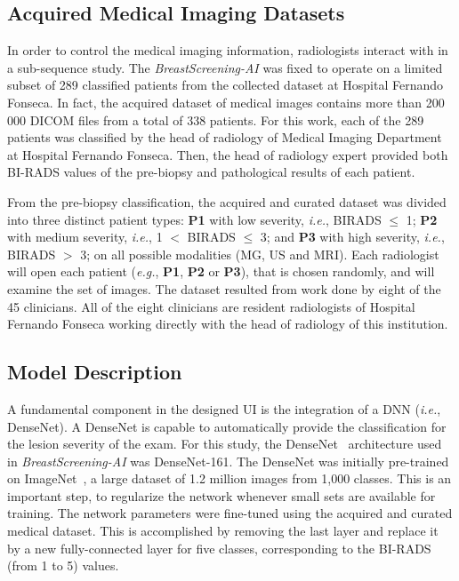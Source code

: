 \subsection{Acquired Medical Imaging Datasets}
\label{sec:app002004004}

In order to control the medical imaging information, radiologists interact with in a sub-sequence study.
The {\it BreastScreening-AI} was fixed to operate on a limited subset of 289 classified patients from the collected dataset at Hospital Fernando Fonseca.
In fact, the acquired dataset of medical images contains more than 200 000 \ac{DICOM} files from a total of 338 patients.
For this work, each of the 289 patients was classified by the head of radiology of Medical Imaging Department at Hospital Fernando Fonseca.
Then, the head of radiology expert provided both \ac{BI-RADS} values of the pre-biopsy and pathological results of each patient.

From the pre-biopsy classification, the acquired and curated dataset was divided into three distinct patient types:
{\bf P1} with low severity, {\it i.e.}, BIRADS $\leq$ 1;
{\bf P2} with medium severity, {\it i.e.}, 1 $<$ BIRADS $\leq$ 3; and
{\bf P3} with high severity, {\it i.e.}, BIRADS $>$ 3;
on all possible modalities (\ac{MG}, \ac{US} and \ac{MRI}).
Each radiologist will open each patient ({\it e.g.}, {\bf P1}, {\bf P2} or {\bf P3}), that is chosen randomly, and will examine the set of images.
The dataset resulted from work done by eight of the 45 clinicians.
All of the eight clinicians are resident radiologists of Hospital Fernando Fonseca working directly with the head of radiology of this institution.

\subsection{Model Description}

A fundamental component in the designed \ac{UI} is the integration of a \ac{DNN} ({\it i.e.}, DenseNet).
A DenseNet is capable to automatically provide the classification for the lesion severity of the exam.
For this study, the DenseNet~\cite{Huang_2017_CVPR} architecture used in {\it BreastScreening-AI} was DenseNet-161.
The DenseNet was initially pre-trained on ImageNet~\cite{10.1145/3351095.3375709}, a large dataset of 1.2 million images from 1,000 classes.
This is an important step, to regularize the network whenever small sets are available for training.
The network parameters were fine-tuned using the acquired and curated medical dataset.
This is accomplished by removing the last layer and replace it by a new fully-connected layer for five classes, corresponding to the \ac{BI-RADS} (from 1 to 5) values.

